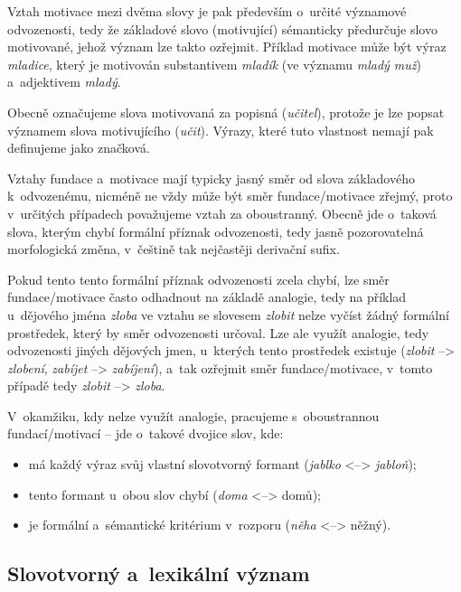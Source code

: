 Vztah motivace mezi dvěma slovy je pak především o~určité významové
odvozenosti, tedy že základové slovo (motivující) sémanticky předurčuje
slovo motivované, jehož význam lze takto ozřejmit.
\parencite[96]{dokulil00} Příklad motivace může být výraz
\emph{mladice}, který je motivován substantivem \emph{mladík} (ve
významu \emph{mladý muž}) a~adjektivem \emph{mladý}.
\parencite[110]{dokulil62}

Obecně označujeme slova motivovaná za popisná (\emph{učitel}), protože
je lze popsat významem slova motivujícího (\emph{učit}). Výrazy, které
tuto vlastnost nemají pak definujeme jako značková.
\parencite[96]{dokulil00}

Vztahy fundace a~motivace mají typicky jasný směr od slova základového
k~odvozenému, nicméně ne vždy může být směr fundace/motivace zřejmý, proto
v~určitých případech považujeme vztah za oboustranný. Obecně jde
o~taková slova, kterým chybí formální příznak odvozenosti, tedy jasně
pozorovatelná morfologická změna, v~češtině tak nejčastěji derivační
sufix.~\parencite[96]{dokulil00}

Pokud tento tento formální příznak odvozenosti zcela chybí, lze směr
fundace/motivace často odhadnout na základě analogie, tedy na příklad
u~dějového jména \emph{zloba} ve vztahu se slovesem \emph{zlobit} nelze
vyčíst žádný formální prostředek, který by směr odvozenosti určoval. Lze
ale využít analogie, tedy odvozenosti jiných dějových jmen, u~kterých
tento prostředek existuje (\emph{zlobit} --\textgreater{}
\emph{zlobení}, \emph{zabíjet} --\textgreater{} \emph{zabíjení}), a~tak
ozřejmit směr fundace/motivace, v~tomto případě tedy \emph{zlobit}
--\textgreater{} \emph{zloba}.~\parencite[96]{dokulil00}

V~okamžiku, kdy nelze využít analogie, pracujeme s~oboustrannou
fundací/motivací -- jde o~takové dvojice slov, kde:

\begin{itemize}
\tightlist
\item
  má každý výraz svůj vlastní slovotvorný formant (\emph{jablko}
  \textless{}--\textgreater{} \emph{jabloň});
\item
  tento formant u~obou slov chybí (\emph{doma}
  \textless{}--\textgreater{} domů);
\item
  je formální a~sémantické kritérium v~rozporu (\emph{něha}
  \textless{}--\textgreater{} něžný).~\parencite[96]{dokulil00}
\end{itemize}

\hypertarget{slovotvornuxfd-a-lexikuxe1lnuxed-vuxfdznam}{%
\subsection{Slovotvorný a~lexikální
význam}\label{slovotvornuxfd-a-lexikuxe1lnuxed-vuxfdznam}}

